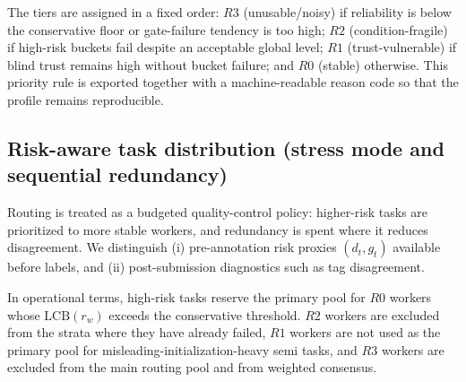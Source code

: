 The tiers are assigned in a fixed order: $R3$ (unusable/noisy) if reliability is below the conservative
floor or gate-failure tendency is too high; $R2$ (condition-fragile) if high-risk buckets fail despite an
acceptable global level; $R1$ (trust-vulnerable) if blind trust remains high without bucket failure; and
$R0$ (stable) otherwise. This priority rule is exported together with a machine-readable reason code so that
the profile remains reproducible.

\subsection{Risk-aware task distribution (stress mode and sequential redundancy)}
\label{sec:routing-policy}

Routing is treated as a budgeted quality-control policy: higher-risk tasks are prioritized to more stable
workers, and redundancy is spent where it reduces disagreement. We distinguish (i) pre-annotation risk
proxies $(d_t,g_t)$ available before labels, and (ii) post-submission diagnostics such as tag disagreement.

In operational terms, high-risk tasks reserve the primary pool for $R0$ workers whose
$\mathrm{LCB}(r_w)$ exceeds the conservative threshold. $R2$ workers are excluded from the strata where they
have already failed, $R1$ workers are not used as the primary pool for misleading-initialization-heavy semi
tasks, and $R3$ workers are excluded from the main routing pool and from weighted consensus.

